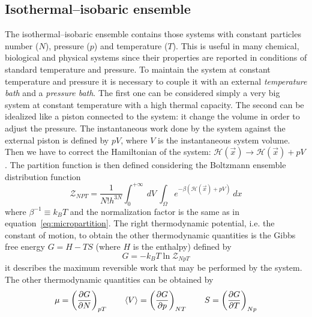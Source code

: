 \subsection{Isothermal--isobaric ensemble}
The isothermal--isobaric ensemble contains those systems with constant particles number ($N$), pressure ($p$) and
temperature ($T$). This is useful in many chemical, biological and physical systems since their properties are
reported in conditions of standard temperature and pressure. To maintain the system at constant temperature and
pressure it is necessary to couple it with an external \textit{temperature bath} and a \textit{pressure bath}.
The first one can be considered simply a very big system at constant temperature with a high thermal capacity.
The second can be idealized like a piston connected to the system: it change the volume in order to adjust the
pressure. The instantaneous work done by the system against the external piston is defined by $pV$, where $V$ is
the instantaneous system volume. Then we have to correct the Hamiltonian of the system:
$\mathcal{H}(\vec x) \rightarrow \mathcal{H}(\vec x) + pV$. The partition function is then defined considering
the Boltzmann ensemble distribution function
\begin{equation}
	\mathcal{Z}_{NPT} = \frac{1}{N!h^{3N}}\int_0^{+\infty}\ dV \ \int_\Omega e^{-\beta(\mathcal{H}(\vec x) + pV)}\ dx
	\label{eq:nptPartition}
\end{equation}
where $\beta^{-1} \equiv k_B T$ and the normalization factor is the same as in
equation~\eqref{eq:micropartition}. The right thermodynamic potential, i.e. the constant of motion, to obtain the
other thermodynamic quantities is the Gibbs free energy $G = H - TS$ (where $H$ is the enthalpy) defined by
\begin{equation*}
	G = -k_B T\ln \mathcal{Z}_{NpT}
\end{equation*}
it describes the maximum reversible work that may be performed by the system. The other thermodynamic quantities
can be obtained by
\begin{equation*}
	\mu = \left ( \frac{\partial G}{\partial N}\right )_{pT} \qquad \left \langle V \right \rangle = \left ( \frac{\partial G}{\partial p}\right )_{NT} \qquad S = \left ( \frac{\partial G}{\partial T}\right )_{Np}
\end{equation*}

